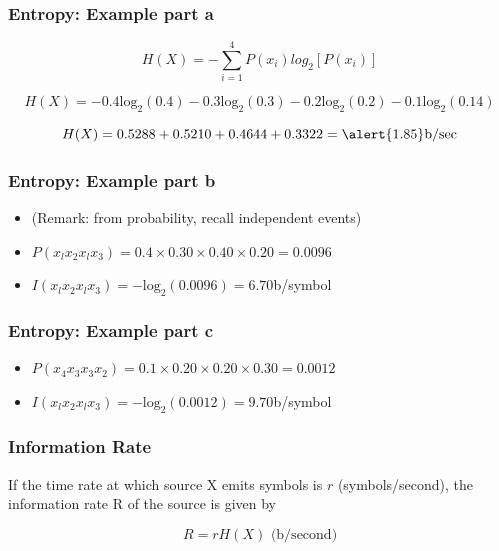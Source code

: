 \documentclass[a4]{beamer}
\begin{document}
\begin{frame}
\frametitle{Entropy: Example part a}

\[ H(X) = - \sum \limits^{4}_{i=1} P(x_i) log_2 [P(x_i)] \]

\[ H(X) = -0.4\mbox{log}_2(0.4) - 0.3\mbox{log}_2(0.3)  -0.2\mbox{log}_2(0.2)  -0.1\mbox{log}_2(0.14) \]



\[ H(X) =  0.5288 + 0.5210 + 0.4644 + 0.3322  = \alert{1.85} \mbox{b/sec} \]

\end{frame}



\begin{frame}
\frametitle{Entropy: Example part b}
\begin{itemize}
\item (Remark: from probability, recall independent events) \bigskip
\item $P(x_lx_2x_lx_3) = 0.4\times 0.30 \times 0.40 \times 0.20  = 0.0096$ \bigskip
\item $I(x_lx_2x_lx_3) = -\mbox{log}_2(0.0096)  = 6.70$b/symbol \bigskip
\end{itemize}
\end{frame}

\begin{frame}
\frametitle{Entropy: Example part c}
\begin{itemize}
\item $P(x_4x_3x_3x_2) = 0.1\times 0.20 \times 0.20 \times 0.30  = 0.0012$ \bigskip
\item $I(x_lx_2x_lx_3) = -\mbox{log}_2(0.0012)  = 9.70$b/symbol \bigskip
\end{itemize}
\end{frame}



\begin{frame}
\frametitle{Information Rate}
If the time rate at which source X emits symbols is $r$ (symbols/second), the information rate R of the
source is given by

\[R = rH(X) \mbox{      (b/second)} \]

\end{frame}
\end{document}
